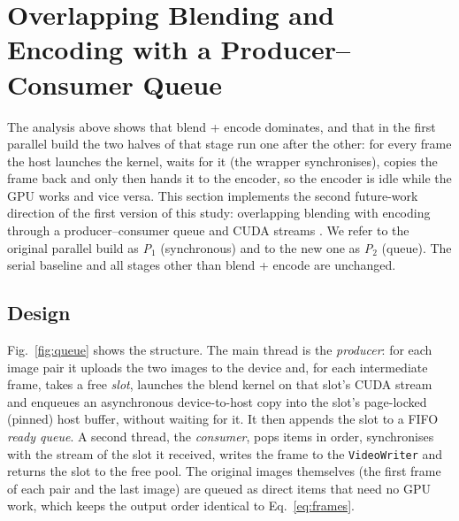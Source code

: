 \documentclass[conference]{IEEEtran}
\begin{document}
\section{Overlapping Blending and Encoding with a Producer--Consumer Queue}
\label{sec:queue}
The analysis above shows that blend + encode dominates, and that in the first parallel build the two halves of that stage run one after the other: for every frame the host launches the kernel, waits for it (the wrapper synchronises), copies the frame back and only then hands it to the encoder, so the encoder is idle while the GPU works and vice versa. This section implements the second future-work direction of the first version of this study: overlapping blending with encoding through a producer--consumer queue and CUDA streams \cite{dijkstra1965,nvidia_cudaguide}. We refer to the original parallel build as \emph{P$_1$} (synchronous) and to the new one as \emph{P$_2$} (queue). The serial baseline and all stages other than blend + encode are unchanged.

\subsection{Design}
Fig.~\ref{fig:queue} shows the structure. The main thread is the \emph{producer}: for each image pair it uploads the two images to the device and, for each intermediate frame, takes a free \emph{slot}, launches the blend kernel on that slot's CUDA stream and enqueues an asynchronous device-to-host copy into the slot's page-locked (pinned) host buffer, without waiting for it. It then appends the slot to a FIFO \emph{ready queue}. A second thread, the \emph{consumer}, pops items in order, synchronises with the stream of the slot it received, writes the frame to the \texttt{VideoWriter} and returns the slot to the free pool. The original images themselves (the first frame of each pair and the last image) are queued as direct items that need no GPU work, which keeps the output order identical to Eq.~\eqref{eq:frames}.
\end{document}
